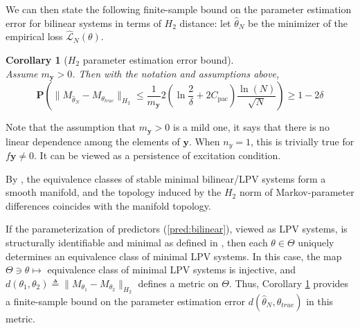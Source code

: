 \documentclass{ifacconf}
\def\eqref#1{(\ref{#1})}
\def\rvu{{\mathbf{i}}}
\def\rvu{{\mathbf{u}}}
\def\rvy{{\mathbf{y}}}
\newcommand{\bP}{\mathbf{P}}
\newtheorem{corollary}{Corollary}[section]
\begin{document}

We can then state the following finite-sample bound on the parameter estimation error for bilinear systems in terms of $H_2$ distance:
let $\hat{\theta}_N$ be the minimizer of the empirical loss $\hat{\mathcal{L}}_N(\theta)$.
\begin{corollary}[$H_2$ parameter estimation error bound]
\leavevmode\\
  Assume $m_{\rvy} > 0$. Then with the notation and assumptions above, 
\label{cor:bilin_H2_param_est_error}
  \[ \bP( \|M_{\hat{\theta}_N}-M_{\theta_{true}}\|_{H_2} \le
    \frac{1}{m_\rvy} 
      2(\ln\dfrac{2}{\delta}+ 2C_{\text{pac}}) \frac{\ln(N)}{\sqrt{N}}) \ge 1-2\delta
   \]
\end{corollary}
Note that the assumption that $m_{\rvy} >0$ is a mild one, it says that there is no linear dependence among the elements of $\rvy$. When $n_y=1$, this is trivially true for $f\rvy \ne 0$. It can be 
viewed as a persistence of excitation condition. 

By \cite{Petreczky2016,MTNSSpace}, the equivalence classes of stable minimal bilinear/LPV systems form a smooth manifold, and the topology induced by the $H_2$ norm of Markov-parameter differences coincides with the manifold topology. 

If the parameterization of predictors \eqref{pred:bilinear}, viewed as LPV systems, is structurally identifiable and minimal as defined in \cite{Petreczky2016, Alkhoury2017a}, then each $\theta \in \Theta$ uniquely determines an equivalence class of minimal LPV systems. In this case, the map $\Theta \ni \theta \mapsto$ equivalence class of minimal LPV systems is injective, and $d(\theta_1,\theta_2) \triangleq \|M_{\theta_1}-M_{\theta_2}\|_{H_2}$ defines a metric on $\Theta$. Thus, Corollary \ref{cor:bilin_H2_param_est_error} provides a finite-sample bound on the parameter estimation error $d(\hat{\theta}_N,\theta_{true})$ in this metric.
\end{document}
